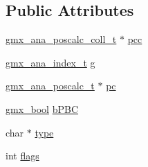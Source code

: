 \subsection*{\-Public \-Attributes}
\begin{DoxyCompactItemize}
\item 
\hyperlink{structgmx__ana__poscalc__coll__t}{gmx\-\_\-ana\-\_\-poscalc\-\_\-coll\-\_\-t} $\ast$ \hyperlink{structt__methoddata__pos_a5cb44a8570633aea89067bc354e691c9}{pcc}
\item 
\hyperlink{structgmx__ana__index__t}{gmx\-\_\-ana\-\_\-index\-\_\-t} \hyperlink{structt__methoddata__pos_a3a688be7bac9b2672f051f3270e42d2b}{g}
\item 
\hyperlink{structgmx__ana__poscalc__t}{gmx\-\_\-ana\-\_\-poscalc\-\_\-t} $\ast$ \hyperlink{structt__methoddata__pos_a218a811180eada9aeecb70b4d657ac44}{pc}
\item 
\hyperlink{include_2types_2simple_8h_a8fddad319f226e856400d190198d5151}{gmx\-\_\-bool} \hyperlink{structt__methoddata__pos_a053355e9fbdf5b3983c7f8e52f8da888}{b\-P\-B\-C}
\item 
char $\ast$ \hyperlink{structt__methoddata__pos_aa30ade9b0148d6623342537aad8128df}{type}
\item 
int \hyperlink{structt__methoddata__pos_ab099252fc0459bdbbc9ed29536b9ad82}{flags}
\end{DoxyCompactItemize}


